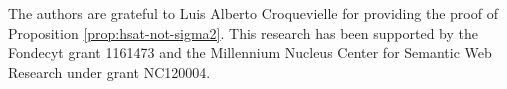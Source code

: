 The authors are grateful to Luis Alberto Croquevielle for providing the proof of Proposition \ref{prop:hsat-not-sigma2}.
This research has been supported by the Fondecyt grant 1161473 and the Millennium Nucleus Center for Semantic Web Research under grant NC120004.